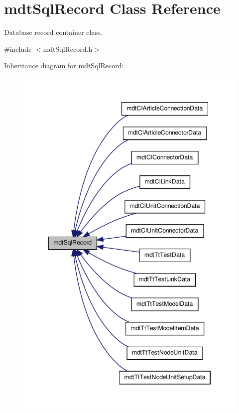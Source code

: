 \hypertarget{classmdt_sql_record}{\section{mdt\-Sql\-Record Class Reference}
\label{classmdt_sql_record}
}


Database record container class.  




{\ttfamily \#include $<$mdt\-Sql\-Record.\-h$>$}



Inheritance diagram for mdt\-Sql\-Record\-:
\nopagebreak
\begin{figure}[H]
\begin{center}
\leavevmode
\includegraphics[width=346pt]{classmdt_sql_record__inherit__graph}
\end{center}
\end{figure}


